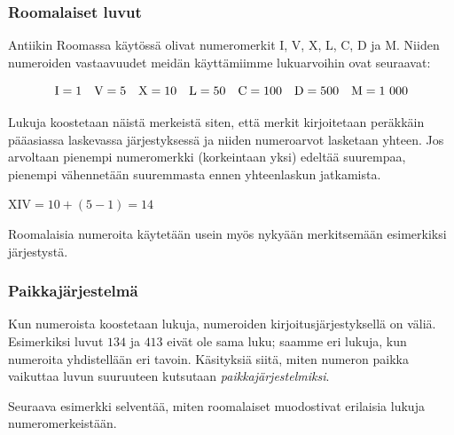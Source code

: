 
\subsubsection*{Roomalaiset luvut}
Antiikin Roomassa käytössä olivat numeromerkit I, V, X, L, C, D ja M. Niiden numeroiden vastaavuudet meidän käyttämiimme lukuarvoihin ovat seuraavat:

\begin{equation*}
\rm I=1\quad
V=5\quad
X=10\quad
L=50\quad
C=100\quad
D=500\quad
M=1~000
\end{equation*}


Lukuja koostetaan näistä merkeistä siten, että merkit kirjoitetaan peräkkäin pääasiassa laskevassa järjestyksessä ja niiden numeroarvot lasketaan yhteen. Jos arvoltaan pienempi numeromerkki (korkeintaan yksi) edeltää suurempaa, pienempi vähennetään suuremmasta ennen yhteenlaskun jatkamista.

\begin{esimerkki}
$\text{XIV} = 10 + (5 - 1) = 14$
\end{esimerkki}

Roomalaisia numeroita käytetään usein myös nykyään merkitsemään esimerkiksi järjestystä.

\subsubsection*{Paikkajärjestelmä}

Kun numeroista koostetaan lukuja, numeroiden kirjoitusjärjestyksellä on väliä. Esimerkiksi luvut $134$ ja $413$ eivät ole sama luku; saamme eri lukuja, kun numeroita yhdistellään eri tavoin. Käsityksiä siitä, miten numeron paikka vaikuttaa luvun suuruuteen kutsutaan \emph{paikkajärjestelmiksi}.

Seuraava esimerkki selventää, miten roomalaiset muodostivat erilaisia lukuja numeromerkeistään.

